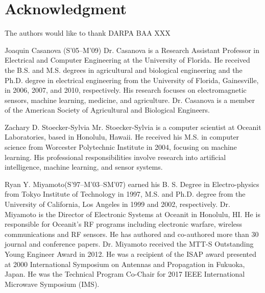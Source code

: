 \documentclass[journal]{IEEEtran}
\begin{document}
\section*{Acknowledgment}
The authors would like to thank DARPA BAA XXX






\begin{IEEEbiographynophoto}{Joaquin Casanova (S'05--M'09)}
  Dr. Casanova is a Research Assistant Professor in Electrical and Computer Engineering at the University of Florida. He received the B.S. and M.S. degrees in agricultural and biological engineering and the Ph.D. degree in electrical engineering from the University of Florida, Gainesville, in 2006, 2007, and 2010, respectively. His research focuses on electromagnetic sensors, machine learning, medicine, and agriculture. Dr. Casanova is a member of the American Society of Agricultural and Biological Engineers.
\end{IEEEbiographynophoto}

\begin{IEEEbiographynophoto}{Zachary D. Stoecker-Sylvia}
Mr. Stoecker-Sylvia is a computer scientist at Oceanit Laboratories, based in Honolulu, Hawaii.  He received his M.S. in computer science from Worcester Polytechnic Institute in 2004, focusing on machine learning.  His professional responsibilities involve research into artificial intelligence, machine learning, and sensor systems.  
\end{IEEEbiographynophoto}


\begin{IEEEbiographynophoto}{Ryan Y. Miyamoto}(S'97--M'03--SM'07) earned his B. S. Degree in Electro-physics from Tokyo Institute of Technology in 1997, M.S. and Ph.D. degree from the University of California, Los Angeles in 1999 and 2002, respectively. Dr. Miyamoto is the Director of Electronic Systems at Oceanit in Honolulu, HI. He is responsible for Oceanit’s RF programs including electronic warfare, wireless communications and RF sensors. 
     He has authored and co-authored more than 30 journal and conference papers. Dr. Miyamoto received the MTT-S Outstanding Young Engineer Award in 2012. He was a recipient of the ISAP award presented at 2000 International Symposium on Antennas and Propagation in Fukuoka, Japan. He was the Technical Program Co-Chair for 2017 IEEE International Microwave Symposium (IMS).
  
\end{IEEEbiographynophoto}
\end{document}
